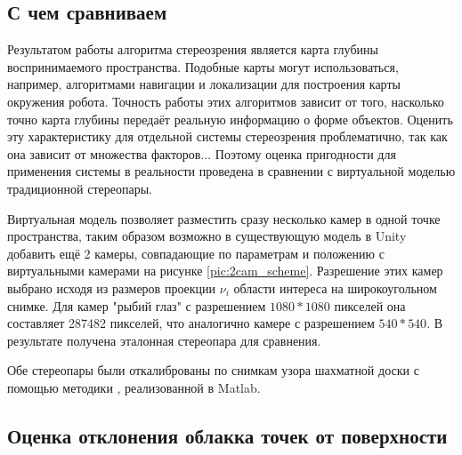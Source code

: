\subsection{С чем сравниваем}  %

Результатом работы алгоритма стереозрения является карта глубины воспринимаемого пространства. Подобные карты могут
использоваться, например, алгоритмами навигации и локализации для построения карты окружения робота. Точность работы 
этих алгоритмов зависит от того, насколько точно карта глубины передаёт реальную информацию о форме объектов. Оценить 
эту характеристику для отдельной системы стереозрения проблематично, так как она зависит от множества факторов...
Поэтому оценка пригодности для применения системы в реальности проведена в сравнении с виртуальной моделью традиционной
стереопары.

Виртуальная модель позволяет разместить сразу несколько камер в одной точке пространства, таким образом возможно
в существующую модель в Unity добавить ещё 2 камеры, совпадающие по параметрам и положению с виртуальными камерами на 
рисунке \ref{pic:2cam_scheme}. Разрешение этих камер выбрано исходя из размеров проекции $\nu_i$ области интереса на широкоугольном
снимке. Для камер "рыбий глаз" с разрешением $1080*1080$ пикселей она составляет 287482 пикселей, что аналогично камере 
с разрешением $540*540$.  В результате получена эталонная стереопара для сравнения. %



Обе стереопары были откалиброваны по снимкам узора шахматной доски с помощью методики \cite{zhang}, реализованной в 
Matlab. 


\subsection{Оценка отклонения облакка точек от поверхности}  %



